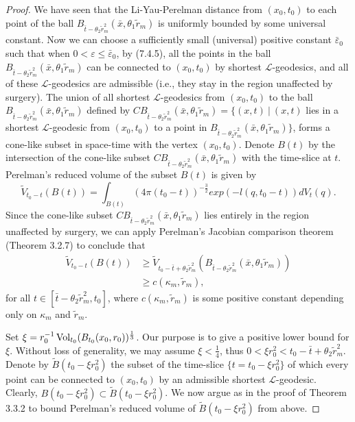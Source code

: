 \begin{proof}
We have seen that the Li-Yau-Perelman distance from $(x_0,t_0)$ to
each point of the ball
$B_{\bar{t}-\theta_2\widetilde{r}^2_m}(\bar{x},\theta_1\widetilde{r}_m)$
is uniformly bounded by some universal constant. Now we can choose
a sufficiently small (universal) positive constant
$\bar{\varepsilon}_0$ such that when $0<\varepsilon \leq
\bar{\varepsilon}_0$, by (7.4.5), all the points in the ball
$B_{\bar{t}-\theta_2\widetilde{r}^2_m}(\bar{x},\theta_1\widetilde{r}_m)$
can be connected to $(x_0,t_0)$ by shortest
$\mathcal{L}$-geodesics, and all of these $\mathcal{L}$-geodesics
are admissible (i.e., they stay in the region unaffected by
surgery). The union of all shortest $\mathcal{L}$-geodesics from
$(x_0,t_0)$ to the ball
$B_{\bar{t}-\theta_2\widetilde{r}^2_m}(\bar{x},
\theta_1\widetilde{r}_m)$ defined by
$CB_{\bar{t}-\theta_2\widetilde{r}^2_m}(\bar{x},
\theta_1\widetilde{r}_m)=\{(x,t)\ |\ (x,t)$ lies in a shortest
$\mathcal{L}$-geodesic from $(x_0,t_0)$ to a point in
$B_{\bar{t}-\theta_2\widetilde{r}^2_m}(\bar{x},
\theta_1\widetilde{r}_m)\}$, forms a cone-like subset in
space-time with the vertex $(x_0,t_0)$. Denote $B(t)$ by the
intersection of the cone-like subset
$CB_{\bar{t}-\theta_2\widetilde{r}^2_m}(\bar{x},\theta_1\widetilde{r}_m)$
with the time-slice at $t$. Perelman's reduced volume of the
subset $B(t)$ is given by
$$
\widetilde{V}_{t_0-t}(B(t))
=\int_{B(t)}(4\pi(t_0-t))^{-\frac{3}{2}}exp(-l(q,t_0-t))dV_t(q).
$$
Since the cone-like subset
$CB_{\bar{t}-\theta_2\widetilde{r}^2_m}(\bar{x},\theta_1\widetilde{r}_m)$
lies entirely in the region unaffected by surgery, we can apply
Perelman's Jacobian comparison theorem (Theorem 3.2.7) to conclude
that
\begin{align}
\widetilde{V}_{t_0-t}(B(t))& \geq
\widetilde{V}_{t_0-\bar{t}+\theta_2\widetilde{r}^2_m}
(B_{\bar{t}-\theta_2\widetilde{r}^2_m}(\bar{x},
\theta_1\widetilde{r}_m))\\
&  \geq c(\kappa_m,\widetilde{r}_m), \nonumber
\end{align}  %
for all $t\in[\bar{t}-\theta_2\widetilde{r}^2_m,t_0]$, where
$c(\kappa_m,\widetilde{r}_m)$ is some positive constant depending
only on $\kappa_m$ and $\widetilde{r}_m$.

Set $\xi=r^{-1}_0\operatorname{Vol}_{t_0}(B_{t_0}(x_0,r_0))^{\frac{1}{3}}$. Our
purpose is to give a positive lower bound for $\xi$. Without loss
of generality, we may assume $\xi<\frac{1}{4}$, thus $0<\xi
r^2_0<t_0-\bar{t}+\theta_2\widetilde{r}^2_m$. Denote by
$\widetilde{B}(t_0-\xi r^2_0)$ the subset of the time-slice
$\{t=t_0-\xi r^2_0\}$ of which every point can be connected to
$(x_0,t_0)$ by an admissible shortest $\mathcal{L}$-geodesic.
Clearly, $B(t_0-\xi r^2_0)\subset\widetilde{B}(t_0-\xi r^2_0)$. We
now argue as in the proof of Theorem 3.3.2 to bound Perelman's
reduced volume of $\widetilde{B}(t_0-\xi r^2_0)$ from above.


\end{proof}
